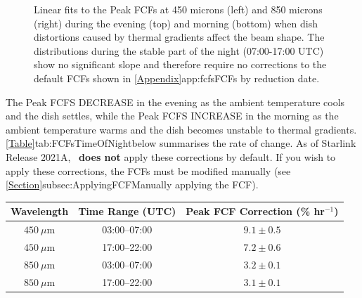 \begin{figure}
\begin{center}
\caption[FCFs Time of Night Fits]{Linear fits to the Peak FCFs at 450 microns (left) and 850 microns (right)
 during the evening (top) and morning (bottom) when dish distortions caused by thermal gradients affect the
 beam shape. The distributions during the stable part of the night (07:00-17:00 UTC) show no significant
 slope and therefore require no corrections to the default FCFs shown in
 \cref{Appendix}{app:fcfs}{FCFs by reduction date}. \label{fig:FCFsTimeOfNightFits}}
\end{center}
\end{figure}


The Peak FCFS DECREASE in the evening as the ambient temperature cools and the dish settles, while
the Peak FCFS INCREASE in the morning as the ambient temperature warms and the dish becomes
unstable to thermal gradients. \cref{Table}{tab:FCFsTimeOfNight}{below} summarises the rate of change.
As of Starlink Release 2021A, \oracdr\ \textbf{does not} apply these corrections by default. If
you wish to apply these corrections, the FCFs must be modified manually (see
\cref{Section}{subsec:ApplyingFCF}{Manually applying the FCF}).


\begin{table}[h!]
\begin{center}
\begin{tabular}{|c|c|c|}
 \hline
 \multicolumn{1}{|c|}{Wavelength} &
 \multicolumn{1}{c|}{Time Range (UTC)} &
 \multicolumn{1}{c|}{Peak FCF Correction (\% hr$^{-1}$)}
 \\ \hline
$450~\mu$m & 03:00--07:00 & $9.1\pm0.5$ \\
$450~\mu$m & 17:00--22:00 & $7.2\pm0.6$ \\
\hline
$850~\mu$m & 03:00--07:00 & $3.2\pm0.1$ \\
$850~\mu$m & 17:00--22:00 & $3.1\pm0.1$ \\ \hline
\end{tabular}
\end{center}
\label{tab:FCFsTimeOfNight}
\end{table}

